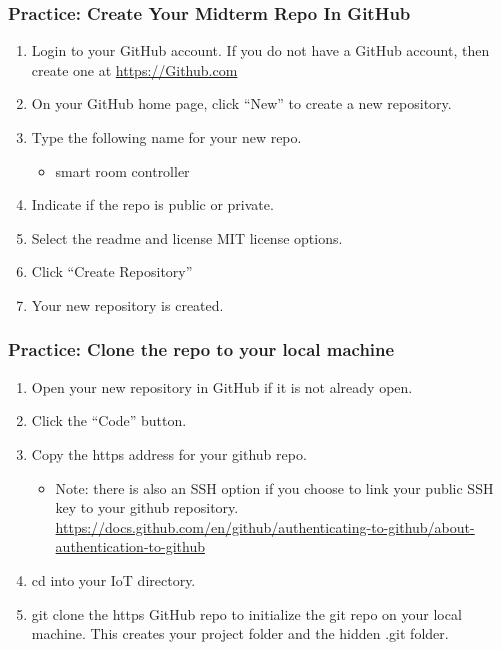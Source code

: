 \documentclass{beamer}
\begin{document}
\begin{frame}\frametitle{Practice: Create Your Midterm Repo In GitHub}
\begin{enumerate}
\item Login to your GitHub account. If you do not have a GitHub account, then create one at \url{https://Github.com}
\item On your GitHub home page, click “New” to create a new repository.
\item Type the following name for your new repo.
\begin{itemize}
\item smart room controller
\end{itemize}
\item Indicate if the repo is public or private. 
\item Select the readme and license MIT license options.
\item Click “Create Repository”
\item Your new repository is created.
\end{enumerate}
\end{frame}

\begin{frame}\frametitle{Practice: Clone the repo to your local machine}
\begin{enumerate}
\item Open your new repository in GitHub if it is not already open.
\item Click the “Code” button.
\item Copy the https address for your github repo.
\begin{itemize}
\item Note: there is also an SSH option if you choose to link your public SSH key to your github repository.  \url{https://docs.github.com/en/github/authenticating-to-github/about-authentication-to-github}
\end{itemize}
\item cd into your IoT directory.
\item git clone the https GitHub repo to initialize the git repo on your local machine. This creates your project folder and the hidden .git folder.
\end{enumerate}
\end{frame}
\end{document}
